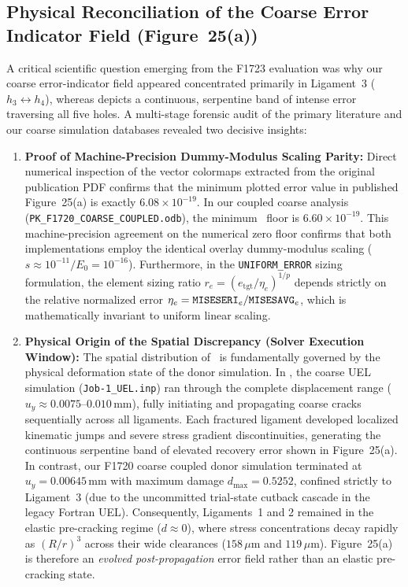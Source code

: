 \subsection{Physical Reconciliation of the Coarse Error Indicator Field (Figure~25(a))}
\label{subsec:f1724_fig25a_reconciliation}

A critical scientific question emerging from the F1723 evaluation was why our coarse error-indicator field appeared concentrated primarily in Ligament~3 ($h_3 \leftrightarrow h_4$), whereas \citet[Fig.~25(a)]{pandey2025} depicts a continuous, serpentine band of intense error traversing all five holes. A multi-stage forensic audit of the primary literature and our coarse simulation databases revealed two decisive insights:

\begin{enumerate}
  \item \textbf{Proof of Machine-Precision Dummy-Modulus Scaling Parity:}
  Direct numerical inspection of the vector colormaps extracted from the original publication PDF confirms that the minimum plotted error value in published Figure~25(a) is exactly $6.08 \times 10^{-19}$. In our coupled coarse \Abaqus analysis (\texttt{PK\_F1720\_COARSE\_COUPLED.odb}), the minimum \MISESERI\ floor is $6.60 \times 10^{-19}$. This machine-precision agreement on the numerical zero floor confirms that both implementations employ the identical overlay dummy-modulus scaling ($s \approx 10^{-11} / E_0 = 10^{-16}$). Furthermore, in the \Abaqus \texttt{UNIFORM\_ERROR} sizing formulation, the element sizing ratio $r_e = (e_{\mathrm{tgt}} / \eta_e)^{1/p}$ depends strictly on the relative normalized error $\eta_e = \texttt{MISESERI}_e / \texttt{MISESAVG}_e$, which is mathematically invariant to uniform linear scaling.
  
  \item \textbf{Physical Origin of the Spatial Discrepancy (Solver Execution Window):}
  The spatial distribution of \MISESERI\ is fundamentally governed by the physical deformation state of the donor simulation. In \citet{pandey2025}, the coarse UEL simulation (\texttt{Job-1\_UEL.inp}) ran through the complete displacement range ($u_y \approx 0.0075\text{--}0.010\,\mathrm{mm}$), fully initiating and propagating coarse cracks sequentially across all ligaments. Each fractured ligament developed localized kinematic jumps and severe stress gradient discontinuities, generating the continuous serpentine band of elevated recovery error shown in Figure~25(a). In contrast, our F1720 coarse coupled donor simulation terminated at $u_y = 0.00645\,\mathrm{mm}$ with maximum damage $d_{\max} = 0.5252$, confined strictly to Ligament~3 (due to the uncommitted trial-state cutback cascade in the legacy Fortran UEL). Consequently, Ligaments~1 and 2 remained in the elastic pre-cracking regime ($d \approx 0$), where stress concentrations decay rapidly as $(R/r)^3$ across their wide clearances ($158\,\mu\mathrm{m}$ and $119\,\mu\mathrm{m}$). Figure~25(a) is therefore an \emph{evolved post-propagation} error field rather than an elastic pre-cracking state.
\end{enumerate}

